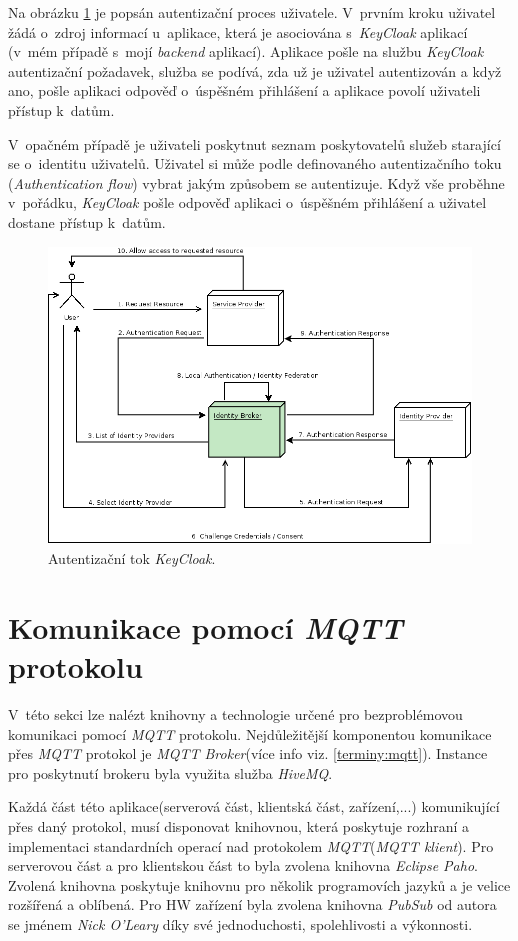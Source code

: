Na obrázku \ref{figure:keycloak_flow} je popsán autentizační proces uživatele. V~prvním kroku uživatel žádá o~zdroj informací u~aplikace, která je asociována s~\emph{KeyCloak} aplikací (v~mém případě s~mojí \emph{backend} aplikací).
Aplikace pošle na službu \emph{KeyCloak} autentizační požadavek, služba se podívá, zda už je uživatel autentizován a když ano, pošle aplikaci odpověď o~úspěšném přihlášení a aplikace povolí uživateli přístup k~datům.

V~opačném případě je uživateli poskytnut seznam poskytovatelů služeb starající se o~identitu uživatelů.
Uživatel si může podle definovaného autentizačního toku (\emph{Authentication flow}) vybrat jakým způsobem se autentizuje.
Když vše proběhne v~pořádku, \emph{KeyCloak} pošle odpověď aplikaci o~úspěšném přihlášení a uživatel dostane přístup k~datům.~\cite{keycloak}

\begin{figure}[hbt]
  \centering
  \includegraphics[width=.8 \linewidth]{obrazky-figures/keycloak_flow.png}
  \caption{Autentizační tok \emph{KeyCloak}.~\cite{keycloak}}
  \label{figure:keycloak_flow}
\end{figure}

\section{Komunikace pomocí \emph{MQTT} protokolu}
\label{pouzite:mqtt}

V~této sekci lze nalézt knihovny a technologie určené pro bezproblémovou komunikaci pomocí \emph{MQTT} protokolu.
Nejdůležitější komponentou komunikace přes \emph{MQTT} protokol je \emph{MQTT Broker}(více info viz. \ref{terminy:mqtt}).
Instance pro poskytnutí brokeru byla využita služba \emph{HiveMQ}.

Každá část této aplikace(serverová část, klientská část, zařízení,...) komunikující přes daný protokol, musí disponovat knihovnou, která poskytuje rozhraní a implementaci standardních operací nad protokolem \emph{MQTT}(\emph{MQTT klient}).
Pro serverovou část a pro klientskou část to byla zvolena knihovna \emph{Eclipse Paho}.
Zvolená knihovna poskytuje knihovnu pro několik programovích jazyků a je velice rozšířená a oblíbená.
Pro HW zařízení byla zvolena knihovna \emph{PubSub} od autora se jménem \emph{Nick O'Leary} díky své jednoduchosti, spolehlivosti a výkonnosti.


